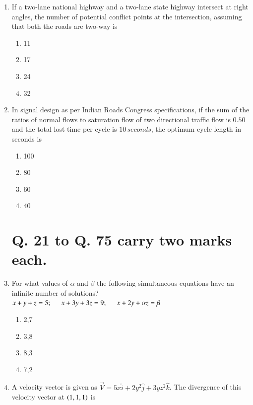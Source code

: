 \documentclass[journal,12pt,onecolumn]{IEEEtran}
\theoremstyle{remark}
\begin{document}
\begin{enumerate}
\item If a two-lane national highway and a two-lane state highway intersect at right angles, the number of potential conflict points at the intersection, assuming that both the roads are two-way is

\hfill{}
\begin{enumerate}
\item 11
\item 17
\item 24
\item 32
\end{enumerate}

\item In signal design as per Indian Roads Congress specifications, if the sum of the ratios of normal flows to saturation flow of two directional traffic flow is $0.50$ and the total lost time per cycle is $10 \, seconds$, the optimum cycle length in seconds is

\hfill{}
\begin{enumerate}
\item 100
\item 80
\item 60
\item 40
\end{enumerate}

\section*{Q. 21 to Q. 75 carry two marks each.}

\item For what values of $\alpha$ and $\beta$ the following simultaneous equations have an infinite number of solutions?
$x+y+z=5; \hspace{0.5cm} x+3y+3z=9; \hspace{0.5cm} x+2y+\alpha z=\beta$

\hfill{}
\begin{enumerate}
\item 2,7
\item 3,8
\item 8,3
\item 7,2
\end{enumerate}

\item A velocity vector is given as $\vec{V} = 5x\hat{i} + 2y^2\hat{j} + 3yz^2\hat{k}$. The divergence of this velocity vector at $\left(1,1,1\right)$ is


\end{enumerate}
\end{document}
